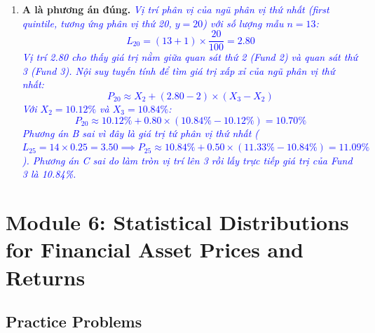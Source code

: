 \begin{enumerate}
	\item \textbf{A là phương án đúng.} \textcolor{blue}{\textit{Vị trí phân vị của ngũ phân vị thứ nhất (first quintile, tương ứng phân vị thứ 20, $y = 20$) với số lượng mẫu $n=13$:
	      \[
	      L_{20} = (13 + 1) \times \frac{20}{100} = 2.80
	      \]
	      Vị trí 2.80 cho thấy giá trị nằm giữa quan sát thứ 2 (Fund 2) và quan sát thứ 3 (Fund 3).
	      Nội suy tuyến tính để tìm giá trị xấp xỉ của ngũ phân vị thứ nhất:
	      \[
	      P_{20} \approx X_2 + (2.80 - 2) \times (X_3 - X_2)
	      \]
	      Với $X_2 = 10.12\%$ và $X_3 = 10.84\%$:
	      \[
	      P_{20} \approx 10.12\% + 0.80 \times (10.84\% - 10.12\%) = 10.70\%
	      \]
	      Phương án B sai vì đây là giá trị tứ phân vị thứ nhất ($L_{25} = 14 \times 0.25 = 3.50 \implies P_{25} \approx 10.84\% + 0.50 \times (11.33\% - 10.84\%) = 11.09\%$). Phương án C sai do làm tròn vị trí lên 3 rồi lấy trực tiếp giá trị của Fund 3 là 10.84\%.}}
\end{enumerate}

\newpage

\section{Module 6: Statistical Distributions for Financial Asset Prices and Returns}
\label{sec:app_Problems_M6}

\subsection{Practice Problems}
\label{subsec:app_Problems_M6}


